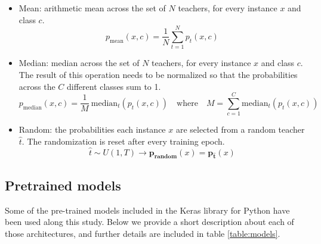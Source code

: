 \documentclass{elsarticle}
\begin{document}
	 \begin{itemize}
	 	\item Mean: arithmetic mean across the set of $N$ teachers, for every instance $x$ and class $c$.
	 	$$p_{\text{mean}}(x, c) = \frac{1}{N} \sum_{t=1}^N p_{t}(x, c)$$
	 	\item Median: median across the set of $N$ teachers, for every instance $x$ and class $c$. The result of this operation needs to be normalized so that the probabilities across the $C$ different classes sum to 1. $$p_{\text{median}}(x, c) = \frac{1}{M} \ \text{median}_t( p_{t}(x, c)) \quad \text{where} \quad M = \sum_{c=1}^C  \text{median}_t( p_{t}(x, c))$$
	 	\item Random: the probabilities each instance $x$ are selected from a random teacher $\hat{t}$. The randomization is reset after every training epoch.
	 	$$\hat{t} \sim U(1, T) \rightarrow \mathbf{p_\text{random}}(x) = \mathbf{p_{\hat{t}}}(x)$$
 	\end{itemize}

    \subsection{Pretrained models}
    Some of the pre-trained models included in the Keras library for Python \citep{chollet2015keras} have been used along this study. Below we provide a short description about each of those architectures, and further details are included in table \ref{table:models}.
\end{document}
